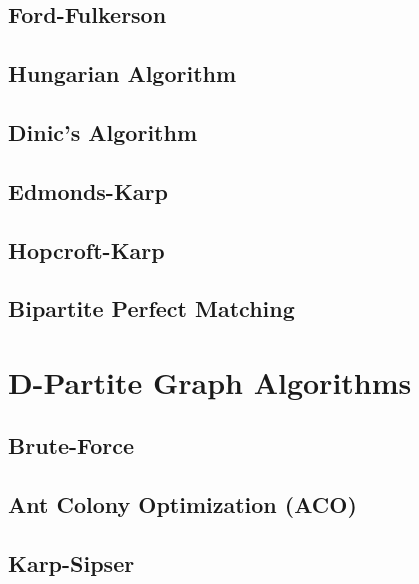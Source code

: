 \documentclass[condensed]{union-cs-thesis}
\begin{document}
\subsection{Ford-Fulkerson}
\label{subsec:ford_fulkerson}


\subsection{Hungarian Algorithm}
\label{subsec:hungarian}


\subsection{Dinic's Algorithm}
\label{subsec:dinics}


\subsection{Edmonds-Karp}
\label{subsec:edmonds_karp}


\subsection{Hopcroft-Karp}
\label{subsec:hopcroft_karp}


\subsection{Bipartite Perfect Matching}


\section{D-Partite Graph Algorithms}
\label{sec:dpartite_algorithms}

\subsection{Brute-Force}
\label{subsec:brute_force}


\subsection{Ant Colony Optimization (ACO)}
\label{subsec:aco}


\subsection{Karp-Sipser}
\label{subsec:karp_sipser}

\end{document}
